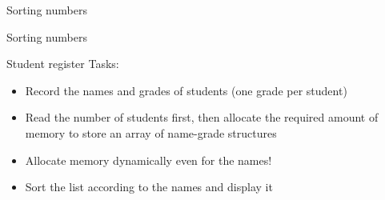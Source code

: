 \documentclass[usenames,dvipsnames,aspectratio=169]{beamer}
\begin{document}
\begin{frame}{Sorting numbers}
  \begin{exampleblock}{}
    
  \end{exampleblock}
\end{frame}

\begin{frame}{Sorting numbers}
  \footnotesize
  \begin{exampleblock}{}
    
  \end{exampleblock}
\end{frame}

\begin{frame}{Student register}
  Tasks:
  \begin{itemize}
    \item Record the names and grades of students (one grade per student)
    \item Read the number of students first, then allocate the required amount of memory to store an array of name-grade structures
    \item Allocate memory dynamically even for the names!
    \item Sort the list according to the names and display it
  \end{itemize}
\end{frame}

%     
%     

%     
\end{document}
